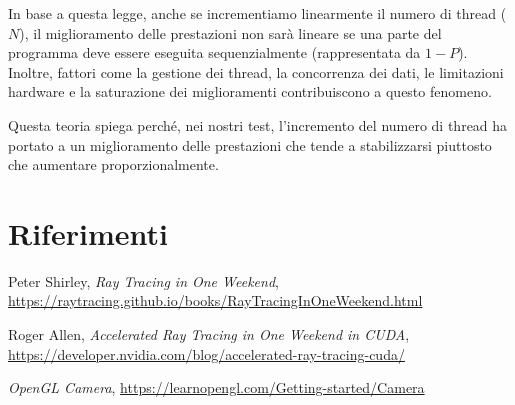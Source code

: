 \documentclass[12pt]{article}
\begin{document}
In base a questa legge, anche se incrementiamo linearmente il numero di thread (\( N \)), il miglioramento delle prestazioni non sarà lineare se una parte del programma deve essere eseguita sequenzialmente (rappresentata da \( 1 - P \)). Inoltre, fattori come la gestione dei thread, la concorrenza dei dati, le limitazioni hardware e la saturazione dei miglioramenti contribuiscono a questo fenomeno.

Questa teoria spiega perché, nei nostri test, l'incremento del numero di thread ha portato a un miglioramento delle prestazioni che tende a stabilizzarsi piuttosto che aumentare proporzionalmente.

\section{Riferimenti}

\begin{thebibliography}{99}
Peter Shirley,
\textit{Ray Tracing in One Weekend},
\url{https://raytracing.github.io/books/RayTracingInOneWeekend.html}

Roger Allen,
\textit{Accelerated Ray Tracing in One Weekend in CUDA},
\url{https://developer.nvidia.com/blog/accelerated-ray-tracing-cuda/}

\textit{OpenGL Camera},
\url{https://learnopengl.com/Getting-started/Camera}

\end{thebibliography}
\end{document}
